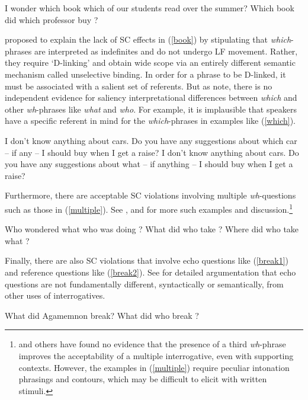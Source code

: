 \documentclass[output=paper]{langsci/langscibook}
\begin{document}
\ea
\ea I wonder which book which of our students read \spc over the summer?
\ex Which book did which professor buy \spc?
\z \label{book}
\z

\noindent
 \citet{pesetskydlink} proposed to explain the lack of SC effects in (\ref{book}) 
by stipulating that  \emph{which}-phrases are interpreted as indefinites and do not undergo LF movement. Rather, they require `D-linking' and obtain wide scope via an entirely different semantic mechanism called unselective binding. In order for a phrase to be D-linked, it must be associated with a salient set of referents. But as \citet[248ff.]{ginzsag} note, there is no independent evidence
for saliency interpretational differences between \emph{which} and other \emph{wh}-phrases like
\emph{what} and \emph{who}. For example, it is implausible that speakers have a specific referent
in mind for the \emph{which}-phrases in examples like (\ref{which}).

\ea
\ea I don't know anything about cars. Do you have any suggestions about which car -- if any -- I should buy when I get a raise?
\ex I don't know anything about cars. Do you have any suggestions about what  -- if anything -- I should buy when I get a raise?\\
\citep[248]{ginzsag}
\z \label{which}
\z



Furthermore, there are acceptable SC violations involving multiple \emph{wh}-questions such as those in (\ref{multiple}). See \citet{Bolinger78}, \citet{kayne83} and \citet[109]{pesetskydlink} for more
such examples and discussion.\footnote{\citet{gibson10} and others have found no evidence
that the presence of a third \emph{wh}-phrase improves the acceptability of a multiple
interrogative, even with supporting contexts. However, the examples in (\ref{multiple}) 
require peculiar intonation phrasings and contours, which may be difficult to elicit with written stimuli.} 

\ea
\ea Who wondered what {\sc who} was doing \spc?
\ex What did {\sc who} take ?
\ex Where did {\sc who} take {\sc what} \spc?
\z \label{multiple}
\z

\noindent 
Finally, there are also SC violations that involve echo questions like (\ref{break1}) and reference
questions like (\ref{break2}). See \citet[Ch.7]{ginzsag} for detailed argumentation that echo questions are not fundamentally different, syntactically or semantically,   from other uses of interrogatives.

\ea
\ea What did Agamemnon break?
\ex What did {\sc who} break \spc?
\z \label{break1}
\z
\end{document}
